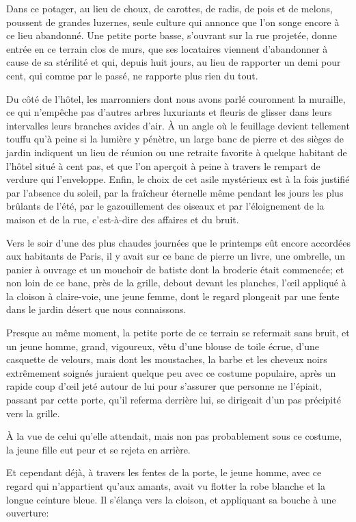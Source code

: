 Dans ce potager, au lieu de choux, de carottes, de radis, de pois et de melons, poussent de grandes luzernes, seule culture qui annonce que l'on songe encore à ce lieu abandonné. Une petite porte basse, s'ouvrant sur la rue projetée, donne entrée en ce terrain clos de murs, que ses locataires viennent d'abandonner à cause de sa stérilité et qui, depuis huit jours, au lieu de rapporter un demi pour cent, qui comme par le passé, ne rapporte plus rien du tout.  

Du côté de l'hôtel, les marronniers dont nous avons parlé couronnent la muraille, ce qui n'empêche pas d'autres arbres luxuriants et fleuris de glisser dans leurs intervalles leurs branches avides d'air. À un angle où le feuillage devient tellement touffu qu'à peine si la lumière y pénètre, un large banc de pierre et des sièges de jardin indiquent un lieu de réunion ou une retraite favorite à quelque habitant de l'hôtel situé à cent pas, et que l'on aperçoit à peine à travers le rempart de verdure qui l'enveloppe. Enfin, le choix de cet asile mystérieux est à la fois justifié par l'absence du soleil, par la fraîcheur éternelle même pendant les jours les plus brûlants de l'été, par le gazouillement des oiseaux et par l'éloignement de la maison et de la rue, c'est-à-dire des affaires et du bruit. 

Vers le soir d'une des plus chaudes journées que le printemps eût encore accordées aux habitants de Paris, il y avait sur ce banc de pierre un livre, une ombrelle, un panier à ouvrage et un mouchoir de batiste dont la broderie était commencée; et non loin de ce banc, près de la grille, debout devant les planches, l'œil appliqué à la cloison à claire-voie, une jeune femme, dont le regard plongeait par une fente dans le jardin désert que nous connaissons. 

Presque au même moment, la petite porte de ce terrain se refermait sans bruit, et un jeune homme, grand, vigoureux, vêtu d'une blouse de toile écrue, d'une casquette de velours, mais dont les moustaches, la barbe et les cheveux noirs extrêmement soignés juraient quelque peu avec ce costume populaire, après un rapide coup d'œil jeté autour de lui pour s'assurer que personne ne l'épiait, passant par cette porte, qu'il referma derrière lui, se dirigeait d'un pas précipité vers la grille. 

À la vue de celui qu'elle attendait, mais non pas probablement sous ce costume, la jeune fille eut peur et se rejeta en arrière. 

Et cependant déjà, à travers les fentes de la porte, le jeune homme, avec ce regard qui n'appartient qu'aux amants, avait vu flotter la robe blanche et la longue ceinture bleue. Il s'élança vers la cloison, et appliquant sa bouche à une ouverture: 

